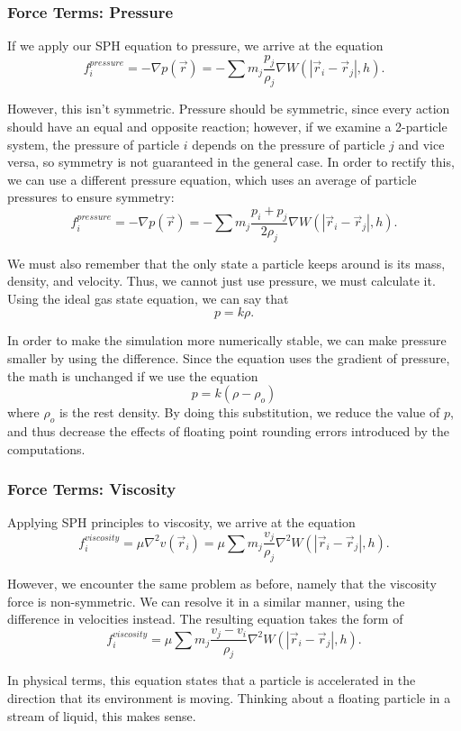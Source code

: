 \documentclass[a4paper,twocolumn]{article}
\begin{document}
\subsubsection{Force Terms: Pressure}
If we apply our SPH equation to pressure, we arrive at the equation
\[f^{pressure}_i = -\nabla p(\vec r) = -\sum m_j \frac{p_j}{\rho_j}\nabla W(|\vec r_i - \vec r_j|, h).\]


However, this isn't symmetric. Pressure should be symmetric, since every action should have an equal and opposite reaction; however, if we examine a 2-particle system, the pressure of particle $i$ depends on the pressure of particle $j$ and vice versa, so symmetry is not guaranteed in the general case. In order to rectify this, we can use a different pressure equation, which uses an average of particle pressures to ensure symmetry:
\[f^{pressure}_i = -\nabla p(\vec r) = -\sum m_j \frac{p_i + p_j}{2\rho_j}\nabla W(|\vec r_i - \vec r_j|, h).\]

We must also remember that the only state a particle keeps around is its mass, density, and velocity. Thus, we cannot just use pressure, we must calculate it. Using the ideal gas state equation, we can say that
\[p = k\rho.\]

In order to make the simulation more numerically stable, we can make pressure smaller by using the difference. Since the equation uses the gradient of pressure, the math is unchanged if we use the equation
\[p = k(\rho - \rho_o)\]
where $\rho_o$ is the rest density. By doing this substitution, we reduce the value of $p$, and thus decrease the effects of floating point rounding errors introduced by the computations.

\subsubsection{Force Terms: Viscosity}
Applying SPH principles to viscosity, we arrive at the equation
\[f^{viscosity}_i = \mu\nabla^2 v(\vec r_i) = \mu \sum m_j \frac{v_j}{\rho_j} \nabla^2 W(|\vec r_i - \vec r_j|, h).\]

However, we encounter the same problem as before, namely that the viscosity force is non-symmetric. We can resolve it in a similar manner, using the difference in velocities instead. The resulting equation takes the form of
\[f^{viscosity}_i = \mu \sum m_j \frac{v_j-v_i}{\rho_j} \nabla^2 W(|\vec r_i - \vec r_j|, h).\]

In physical terms, this equation states that a particle is accelerated in the direction that its environment is moving. Thinking about a floating particle in a stream of liquid, this makes sense.
\end{document}
